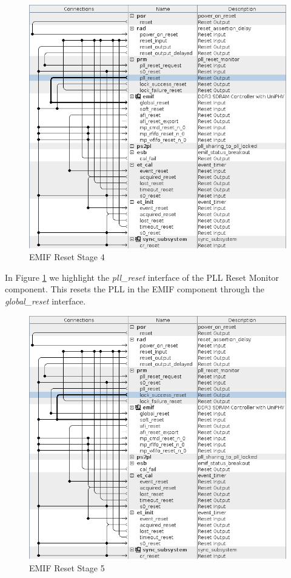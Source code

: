 \documentclass{article}
\begin{document}
\begin{flushleft}
\begin{figure}[H]
\centering
\includegraphics[scale=0.675]{emif_reset_stage_4}
\caption{EMIF Reset Stage 4}
\label{fig:emif_reset_stage_4}
\end{figure}

In Figure \ref{fig:emif_reset_stage_4} we highlight the \emph{pll\_reset} interface of the PLL Reset Monitor component.  This resets the PLL in the EMIF component through the \emph{global\_reset} interface.

\begin{figure}[H]
\centering
\includegraphics[scale=0.675]{emif_reset_stage_5}
\caption{EMIF Reset Stage 5}
\label{fig:emif_reset_stage_5}
\end{figure}


\end{flushleft}
\end{document}
